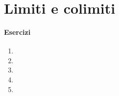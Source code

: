 \chapter{Limiti e colimiti}\label{chap_limiti_colimiti}
\subsubsection*{Esercizi}
\begin{enumerate}
	\item
	\item
	\item
	\item
	\item
\end{enumerate}
